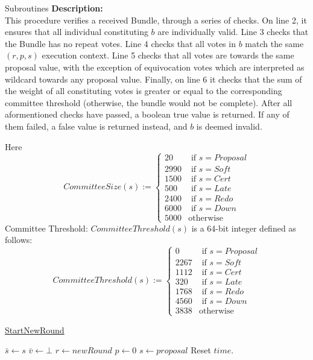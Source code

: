 \documentclass[10pt,a4paper]{article}
\begin{document}
\begin{section}{Subroutines}
\noindent \textbf{Description:}\\
This procedure verifies a received Bundle, through a series 
of checks.
On line 2, it ensures that all individual constituting $b$
are individually valid.
Line 3 checks that the Bundle has no repeat votes.
Line 4 checks that all votes in $b$ match the same $(r,p,s)$
execution context.
Line 5 checks that all votes are towards the same proposal value,
with the exception of equivocation votes which are interpreted as wildcard
towards any proposal value.
Finally, on line 6 it checks that the sum of the weight of all constituting
votes is greater or equal to the corresponding committee threshold (otherwise, 
the bundle would not be complete).
After all aformentioned checks have passed, a boolean true value is returned.
If any of them failed, a false value is returned instead, and $b$ is deemed invalid.

Here
$$
CommitteeSize(s):= \left\{
\begin{array}{rl}
     20 & \text{ if }s = Proposal \\
   2990 & \text{ if }s = Soft \\
   1500 & \text{ if }s = Cert \\
    500 & \text{ if }s = Late \\
   2400 & \text{ if }s = Redo \\
   6000 & \text{ if }s = Down \\
   5000 & \text{otherwise}
\end{array}
\right.
$$
Committee Threshold: $CommitteeThreshold(s)$ is a 64-bit integer defined as follows:
$$
CommitteeThreshold(s):= \left\{
\begin{array}{rl}
     0 &  \text{ if }s = Proposal \\
  2267 &  \text{ if }s = Soft \\
  1112 &  \text{ if }s = Cert \\
   320 &  \text{ if }s = Late \\
  1768 &  \text{ if }s = Redo \\
  4560 &  \text{ if }s = Down \\
  3838 &  \text{otherwise}
\end{array}
\right.
$$


\begin{algorithm}[H]\label{algo:start-new-round}
    \caption{\underline{StartNewRound}}
    \label{algo:start-new-round}
    \begin{algorithmic}[1]
    \State $\bar{s} \gets s$
    \State $\bar{v} \gets \bot$
    \State $r \gets newRound$
    \State $p \gets 0$
    \State $s \gets proposal$
    \State Reset $time$.
    \EndFunction
    \end{algorithmic}
\end{algorithm}


\end{section}
\end{document}
